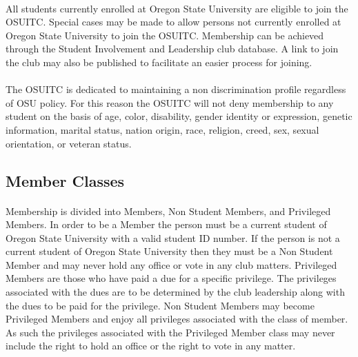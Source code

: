 \documentclass[12pt]{article}
\begin{document}
\paragraph{}
All students currently enrolled at Oregon State University are eligible to join the OSUITC. Special cases may be made to allow persons not currently enrolled at Oregon State University to join the OSUITC. Membership can be achieved through the Student Involvement and Leadership club database. A link to join the club may also be published to facilitate an easier process for joining.

\paragraph{}
The OSUITC is dedicated to maintaining a non discrimination profile regardless of OSU policy. For this reason the OSUITC will not deny membership to any student on the basis of age, color, disability, gender identity or expression, genetic information, marital status, nation origin, race, religion, creed,  sex, sexual orientation, or veteran status. 

\subsection{Member Classes}
\paragraph{}
Membership is divided into Members, Non Student Members, and Privileged Members. In order to be a Member the person must be a current student of Oregon State University with a valid student ID number.
If the person is not a current student of Oregon State University then they must be a Non Student Member and may never hold any office or vote in any club matters.
Privileged Members are those who have paid a due for a specific privilege. The privileges associated with the dues are to be determined by the club leadership along with the dues to be paid for the privilege.
Non Student Members may become Privileged Members and enjoy all privileges associated with the class
of member. As such the privileges associated with the Privileged Member class may never include 
the right to hold an office or the right to vote in any matter.

\end{document}
